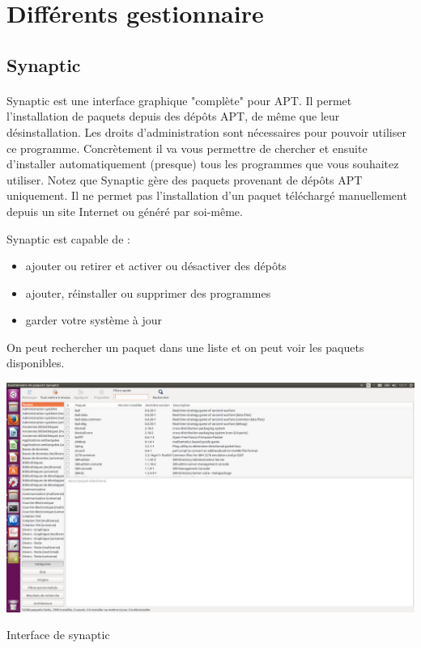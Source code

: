 \documentclass[a4paper,12pt]{article}
\begin{document}
\section{Différents gestionnaire}
\subsection{Synaptic}
\paragraph{}
Synaptic est une interface graphique "complète" pour APT. Il permet l'installation de paquets depuis des dépôts APT, de même que leur désinstallation. Les droits d'administration sont nécessaires pour pouvoir utiliser ce programme.
Concrètement il va vous permettre de chercher et ensuite d'installer automatiquement (presque) tous les programmes que vous souhaitez utiliser. Notez que Synaptic gère des paquets ​provenant de dépôts APT uniquement. Il ne permet ​pas
l'​installation d'un paquet téléchargé manuellement depuis un site Internet ou généré par soi-même. ​

Synaptic est capable de :
\begin{itemize}
\item ajouter ou retirer et activer ou désactiver des dépôts 
\item ajouter, réinstaller ou supprimer des programmes 
\item garder votre système à jour
\end{itemize}
On peut rechercher un paquet dans une liste et on peut voir les paquets disponibles.
\begin{center}

\includegraphics[width=1\textwidth]{synaptic.png}
\end{center}
\begin{center}
 Interface de synaptic
\end{center}
\end{document}
